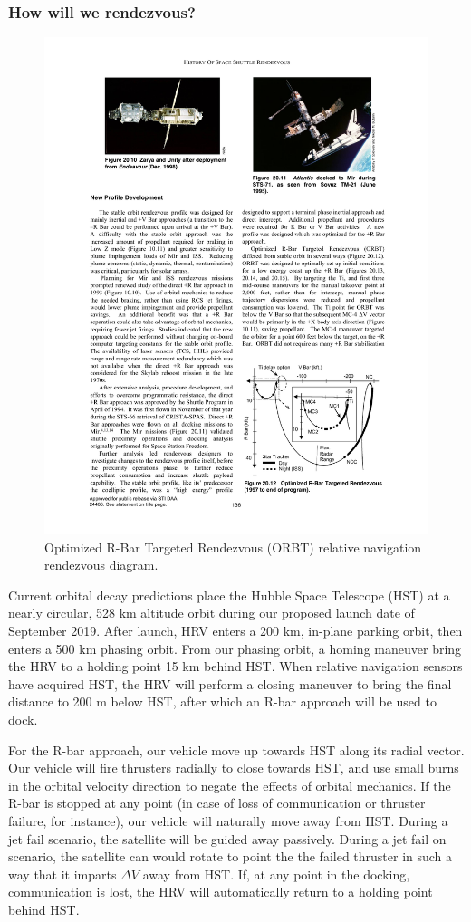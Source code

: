 \documentclass[paper=letter, fontsize=11pt]{scrartcl} %
\numberwithin{equation}{section} %
\numberwithin{figure}{section} %
\numberwithin{table}{section} %
\begin{document}
\subsubsection{How will we rendezvous?}
\begin{figure}[tbh!]
    \begin{center}
        \includegraphics[width=.75\textwidth]{imgs/orbt.pdf}
        \caption{Optimized R-Bar Targeted Rendezvous (ORBT) relative navigation rendezvous diagram.}
    \end{center}
\end{figure}

Current orbital decay predictions place the Hubble Space Telescope (HST) at a nearly circular, 528 km altitude orbit during our proposed launch date of September 2019. After launch, HRV enters a 200 km, in-plane parking orbit, then enters a 500 km phasing orbit. From our phasing orbit, a homing maneuver bring the HRV to a holding point 15 km behind HST. When relative navigation sensors have acquired HST, the HRV will perform a closing maneuver to bring the final distance to 200 m below HST, after which an R-bar approach will be used to dock.

For the R-bar approach, our vehicle move up towards HST along its radial vector. Our vehicle will fire thrusters radially to close towards HST, and use small burns in the orbital velocity direction to negate the effects of orbital mechanics. If the R-bar is stopped at any point (in case of loss of communication or thruster failure, for instance), our vehicle will naturally move away from HST. During a jet fail scenario, the satellite will be guided away passively. During a jet fail on scenario, the satellite can would rotate to point the the failed thruster in such a way that it imparts $\Delta V$ away from HST. If, at any point in the docking, communication is lost, the HRV will automatically return to a holding point behind HST.
\end{document}
